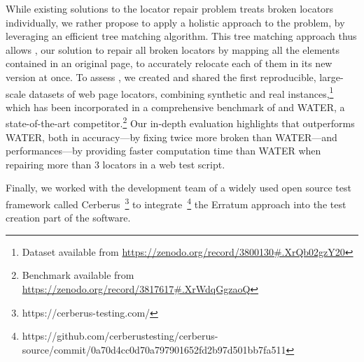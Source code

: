 \documentclass[preprint, 12pt]{elsarticle}
\begin{document}
While existing solutions to the locator repair problem treats broken locators individually, we rather propose to apply a holistic approach to the problem, by leveraging an efficient tree matching algorithm.
This tree matching approach thus allows \erratum{}, our solution to repair all broken locators by mapping all the elements contained in an original page, to accurately relocate each of them in its new version at once.
% 
To assess \erratum{}, we created and shared the first reproducible, large-scale datasets of web page locators, combining synthetic and real instances,\footnote{Dataset available from \url{https://zenodo.org/record/3800130\#.XrQb02gzY20}} which has been incorporated in a comprehensive benchmark of \erratum{} and WATER, a state-of-the-art competitor.\footnote{Benchmark available from \url{https://zenodo.org/record/3817617\#.XrWdqGgzaoQ}}
%
Our in-depth evaluation highlights that \erratum{} outperforms WATER, both in accuracy---by fixing twice more broken than WATER---and performances---by providing faster computation time than WATER when repairing more than 3 locators in a web test script.

Finally, we worked with the development team of a widely used open source test framework called Cerberus~\footnote{https://cerberus-testing.com/} to integrate~\footnote{https://github.com/cerberustesting/cerberus-source/commit/0a70d4cc0d70a797901652fd2b97d501bb7fa511} the Erratum approach into the test creation part of the software.

% 


\end{document}
